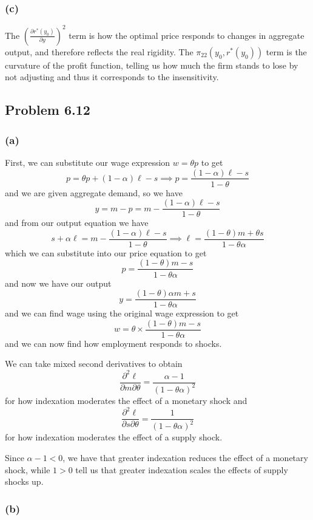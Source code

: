 \documentclass[11pt]{amsart}
\begin{document}
\subsubsection*{(c)}

The $\left(\frac{\partial r^*(y_0)}{\partial y}\right)^2$ term is how the optimal price responds to changes in aggregate output, and therefore reflects the real rigidity.
The $\pi_{22}(y_0, r^*(y_0))$ term is the curvature of the profit function, telling us how much the firm stands to lose by not adjusting and thus it corresponds to the insensitivity.


\subsection{Problem 6.12}

\subsubsection*{(a)}
First, we can substitute our wage expression $w = \theta p$ to get
\[
p = \theta p + (1-\alpha) \ell - s \implies p = \frac{(1-\alpha) \ell - s}{1-\theta}
\]
and we are given aggregate demand, so we have
\[
y = m - p = m - \frac{(1-\alpha) \ell - s}{1-\theta}
\]
and from our output equation we have
\[
s + \alpha \ell = m - \frac{(1-\alpha) \ell - s}{1-\theta} \implies \ell = \frac{(1-\theta) m + \theta s}{1-\theta \alpha}
\]
which we can substitute into our price equation to get
\[
p = \frac{(1-\theta) m - s}{1-\theta \alpha}
\]
and now we have our output
\[
y = \frac{(1-\theta) \alpha m + s}{1-\theta \alpha}
\]
and we can find wage using the original wage expression to get
\[
w = \theta \times \frac{(1-\theta) m - s}{1-\theta \alpha}
\]
and we can now find how employment responds to shocks.

We can take mixed second derivatives to obtain
\[
\frac{\partial^2 \ell}{\partial m \partial \theta} = \frac{\alpha - 1}{(1-\theta \alpha)^2}
\]
for how indexation moderates the effect of a monetary shock and
\[
\frac{\partial^2 \ell}{\partial s \partial \theta} = \frac{1}{(1-\theta \alpha)^2}
\]
for how indexation moderates the effect of a supply shock.

Since $\alpha - 1 < 0$, we have that greater indexation reduces the effect of a monetary shock, while $1 > 0$ tell us that greater indexation scales the effects of supply shocks up.

\subsubsection*{(b)}
\end{document}
